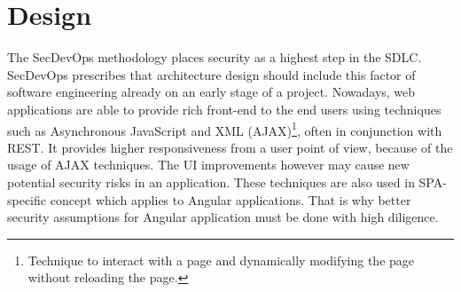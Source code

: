 \documentclass{article} %
\begin{document}
\section {Design}
\normalsize The SecDevOps methodology places security as a highest step in the SDLC. SecDevOps prescribes that architecture design should include this factor of software engineering already on an early stage of a project. Nowadays, web applications are able to provide rich front-end to the end users using techniques such as Asynchronous JavaScript and XML (AJAX)\footnote{Technique to interact with a page and dynamically modifying the page without reloading the page.}, often in conjunction with REST. It provides higher responsiveness from a user point of view, because of the usage of AJAX techniques. The UI improvements however may cause new potential security risks in an application. These techniques are also used in SPA-specific concept which applies to Angular applications. That is why better security assumptions for Angular application must be done with high diligence.
\end{document}
